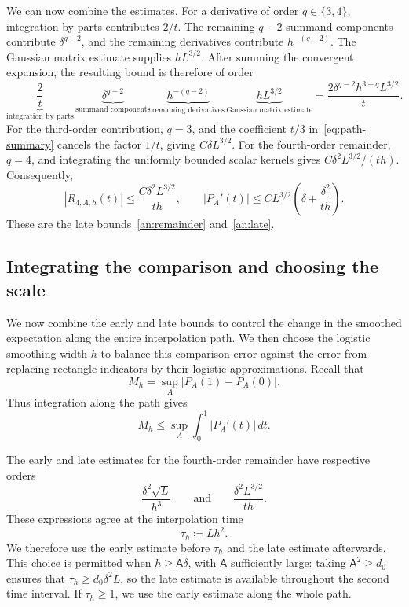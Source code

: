\documentclass[11pt,letterpaper]{article}
\theoremstyle{remark}
\newcommand{\dd}{\,d}
\begin{document}
We can now combine the estimates. For a derivative of order
\(q\in\{3,4\}\), integration by parts contributes \(2/t\). The
remaining \(q-2\) summand components contribute \(\delta^{q-2}\),
and the remaining derivatives contribute \(h^{-(q-2)}\). The
Gaussian matrix estimate supplies \(hL^{3/2}\). After summing the
convergent expansion, the resulting bound is therefore of order
\[
 \underbrace{\frac2t}_{\text{integration by parts}}\,
 \underbrace{\delta^{q-2}}_{\text{summand components}}\,
 \underbrace{h^{-(q-2)}}_{\text{remaining derivatives}}\,
 \underbrace{hL^{3/2}}_{\text{Gaussian matrix estimate}}
 =\frac{2\delta^{q-2}h^{3-q}L^{3/2}}{t}.
\]
For the third-order contribution, \(q=3\), and the coefficient
\(t/3\) in~\eqref{eq:path-summary} cancels the factor \(1/t\),
giving \(C\delta L^{3/2}\). For the fourth-order remainder, \(q=4\),
and integrating the uniformly bounded scalar kernels gives
\(C\delta^2L^{3/2}/(th)\). Consequently,
\[
 |R_{4,A,h}(t)|\le\frac{C\delta^2L^{3/2}}{th},
 \qquad
 |P_A'(t)|\le CL^{3/2}\left(\delta+\frac{\delta^2}{th}\right).
\]
These are the late bounds~\eqref{an:remainder} and~\eqref{an:late}.


\subsection{\texorpdfstring{Integrating the comparison and choosing the scale}{Integrating the comparison and choosing the scale}}\label{sec:rate}
We now combine the early and late bounds to control the change in the
smoothed expectation along the entire interpolation path. We then
choose the logistic smoothing width \(h\) to balance this comparison
error against the error from replacing rectangle indicators by their
logistic approximations. Recall that
\[
 M_h=\sup_A|P_A(1)-P_A(0)|.
\]
Thus integration along the path gives
\[
 M_h\le\sup_A\int_0^1|P_A'(t)|\dd t.
\]

The early and late estimates for the fourth-order remainder have
respective orders
\[
 \frac{\delta^2\sqrt L}{h^3}
 \qquad\text{and}\qquad
 \frac{\delta^2L^{3/2}}{th}.
\]
These expressions agree at the interpolation time
\[
 \tau_h\coloneqq Lh^2.
\]
We therefore use the early estimate before \(\tau_h\) and the late
estimate afterwards. This choice is permitted when
\(h\ge\mathsf A\delta\), with \(\mathsf A\) sufficiently large:
taking \(\mathsf A^2\ge d_0\) ensures that
\(\tau_h\ge d_0\delta^2L\), so the late estimate is available
throughout the second time interval. If \(\tau_h\ge1\), we use the
early estimate along the whole path.
\end{document}
